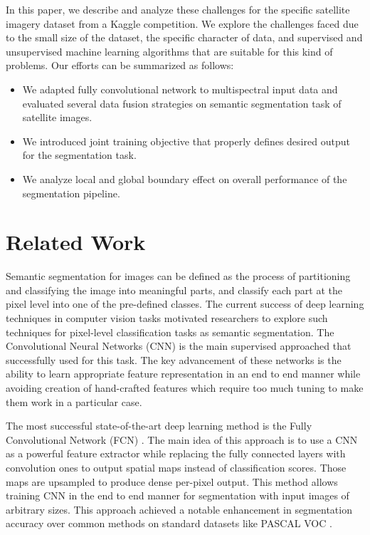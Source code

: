 \documentclass[10pt,twocolumn,letterpaper]{article}
\begin{document}
In this paper, we describe and analyze these challenges for the specific satellite imagery dataset from a Kaggle competition.  We explore the challenges faced due to the small size of the dataset, the specific character of data, and supervised and unsupervised machine learning algorithms that are suitable for this kind of problems. Our efforts  can be summarized as follows:
\begin{itemize}
\item We adapted fully convolutional network to multispectral input data and evaluated several data fusion strategies on semantic segmentation task of satellite images.

\item We introduced joint training objective that properly defines desired output for the segmentation task.

\item We analyze local and global boundary effect on overall performance of the segmentation pipeline.

\end{itemize}


\section{Related Work}
\label{section:related_work}
Semantic segmentation for images can be defined as the process of partitioning and classifying the image into meaningful parts, and classify each part at the pixel level into one of the pre-defined classes. The current success of deep learning techniques in computer vision tasks motivated researchers to explore such techniques for pixel-level classification tasks as semantic segmentation. The Convolutional Neural Networks (CNN) is the main supervised approached that successfully used for this task. The key advancement of these networks is the ability to learn appropriate feature representation in an end to end manner while avoiding creation of hand-crafted features which require too much tuning to make them work in a particular case.

The most successful state-of-the-art deep learning method is the Fully Convolutional Network (FCN) \cite{fcn}.  The main idea of this approach is to use a CNN as a powerful feature extractor while replacing the fully connected layers with convolution ones to output spatial maps instead of classification scores. Those maps are upsampled to produce dense per-pixel output. This method allows training CNN in the end to end manner for segmentation with input images of arbitrary sizes. This approach achieved a notable enhancement in segmentation accuracy over common methods on standard datasets like PASCAL VOC \cite{pascal}.
\end{document}
